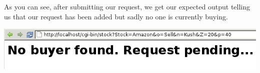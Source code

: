 As you can see, after submitting our request, we get our expected output telling us that our request has been added but sadly no one is currently buying.

 
\includegraphics[scale=0.5]{../test3.png}
 
